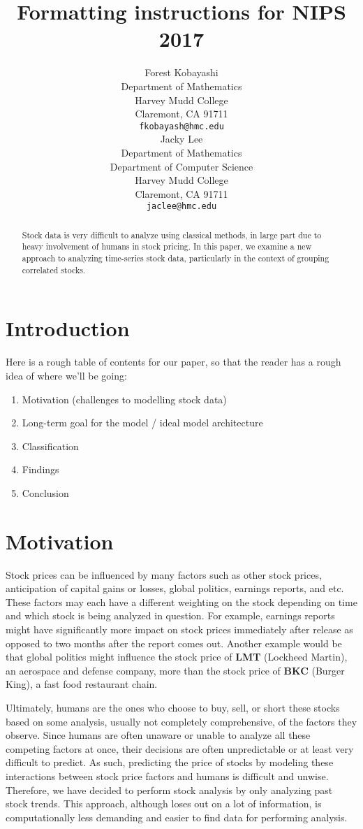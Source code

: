 \documentclass[final]{article}
\title{Formatting instructions for NIPS 2017}
\author{
  Forest Kobayashi \\
  Department of Mathematics\\
  Harvey Mudd College\\
  Claremont, CA 91711 \\
  \texttt{fkobayash@hmc.edu} \\
  \And
  Jacky Lee \\
  Department of Mathematics\\
  Department of Computer Science \\
  Harvey Mudd College \\
  Claremont, CA 91711 \\
  \texttt{jaclee@hmc.edu}
}
\begin{document}

\maketitle

\begin{abstract}
  Stock data is very difficult to analyze using classical methods, in large
  part due to heavy involvement of humans in stock pricing. In this paper, we
  examine a new approach to analyzing time-series stock data, particularly in
  the context of grouping correlated stocks.
\end{abstract}

\section{Introduction}
Here is a rough table of contents for our paper, so that the reader has a rough
idea of where we'll be going:
\begin{enumerate}
  \item Motivation (challenges to modelling stock data)
  \item Long-term goal for the model / ideal model architecture
  \item Classification
  \item Findings
  \item Conclusion
\end{enumerate}

\section{Motivation}
Stock prices can be influenced by many factors such as other stock prices,
anticipation of capital gains or losses, global politics, earnings reports, and
etc. These factors may each have a different weighting on the stock depending
on time and which stock is being analyzed in question. For example, earnings
reports might have significantly more impact on stock prices immediately after
release as opposed to two months after the report comes out. Another example
would be that global politics might influence the stock price of \textbf{LMT}
(Lockheed Martin), an aerospace and defense company, more than the stock price
of \textbf{BKC} (Burger King), a fast food restaurant chain.

Ultimately, humans are the ones who choose to buy, sell, or short these stocks
based on some analysis, usually not completely comprehensive, of the factors
they observe. Since humans are often unaware or unable to analyze all these
competing factors at once, their decisions are often unpredictable or at least
very difficult to predict. As such, predicting the price of stocks by modeling
these interactions between stock price factors and humans is difficult and
unwise. Therefore, we have decided to perform stock analysis by only analyzing
past stock trends. This approach, although loses out on a lot of information,
is computationally less demanding and easier to find data for performing
analysis.
\end{document}
